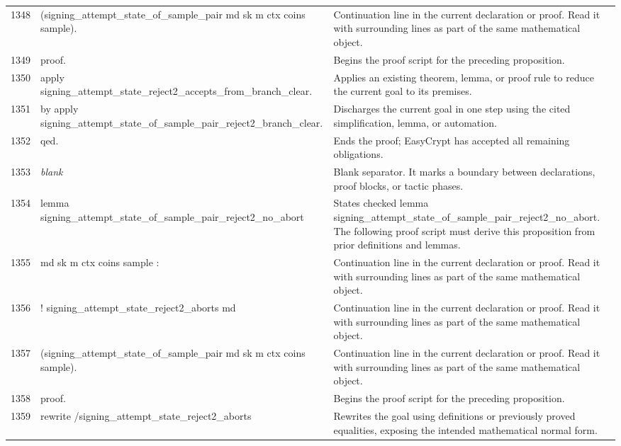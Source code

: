 \documentclass[10pt]{article}
\begin{document}
\begin{longtable}{r L{0.53\textwidth} L{0.37\textwidth}}
1348 & {\ttfamily\scriptsize     (signing\_attempt\_state\_of\_sample\_pair md sk m ctx coins sample).} & Continuation line in the current declaration or proof.  Read it with surrounding lines as part of the same mathematical object. \\
1349 & {\ttfamily\scriptsize proof.} & Begins the proof script for the preceding proposition. \\
1350 & {\ttfamily\scriptsize apply signing\_attempt\_state\_reject2\_accepts\_from\_branch\_clear.} & Applies an existing theorem, lemma, or proof rule to reduce the current goal to its premises. \\
1351 & {\ttfamily\scriptsize by apply signing\_attempt\_state\_of\_sample\_pair\_reject2\_branch\_clear.} & Discharges the current goal in one step using the cited simplification, lemma, or automation. \\
1352 & {\ttfamily\scriptsize qed.} & Ends the proof; EasyCrypt has accepted all remaining obligations. \\
1353 & {\ttfamily\scriptsize \emph{blank}} & Blank separator.  It marks a boundary between declarations, proof blocks, or tactic phases. \\
1354 & {\ttfamily\scriptsize lemma signing\_attempt\_state\_of\_sample\_pair\_reject2\_no\_abort} & States checked lemma signing\_attempt\_state\_of\_sample\_pair\_reject2\_no\_abort.  The following proof script must derive this proposition from prior definitions and lemmas. \\
1355 & {\ttfamily\scriptsize    md sk m ctx coins sample :} & Continuation line in the current declaration or proof.  Read it with surrounding lines as part of the same mathematical object. \\
1356 & {\ttfamily\scriptsize   ! signing\_attempt\_state\_reject2\_aborts md} & Continuation line in the current declaration or proof.  Read it with surrounding lines as part of the same mathematical object. \\
1357 & {\ttfamily\scriptsize       (signing\_attempt\_state\_of\_sample\_pair md sk m ctx coins sample).} & Continuation line in the current declaration or proof.  Read it with surrounding lines as part of the same mathematical object. \\
1358 & {\ttfamily\scriptsize proof.} & Begins the proof script for the preceding proposition. \\
1359 & {\ttfamily\scriptsize rewrite /signing\_attempt\_state\_reject2\_aborts} & Rewrites the goal using definitions or previously proved equalities, exposing the intended mathematical normal form. \\

\end{longtable}
\end{document}
